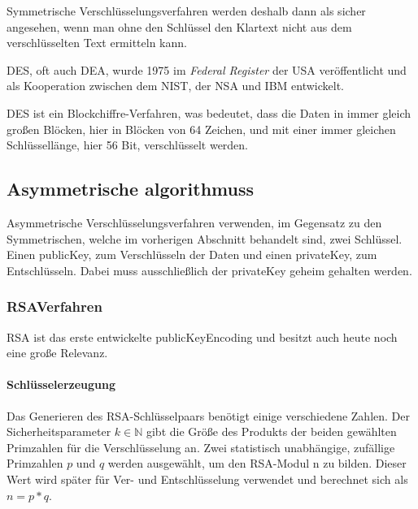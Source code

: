 Symmetrische Verschlüsselungsverfahren werden deshalb dann als sicher angesehen, wenn man ohne den Schlüssel den Klartext nicht aus dem verschlüsselten Text ermitteln kann.\autocite[\pagef~5]{kryptographische-algorithmen}

\ac{DES}, oft auch \ac{DEA}, wurde 1975 im \textit{Federal Register} der USA veröffentlicht und als Kooperation zwischen dem \ac{NIST}, der \ac{NSA} und \ac{IBM} entwickelt.\autocite[\pagef~232]{nsa-meyer}

\ac{DES} ist ein Blockchiffre-Verfahren, was bedeutet, dass die Daten in immer gleich großen Blöcken, hier in Blöcken von 64 Zeichen, und mit einer immer gleichen Schlüssellänge, hier 56 Bit, verschlüsselt werden.\autocite[\pagef~6]{kryptographische-algorithmen}


\subsection[Asymmetrische Algorithmen]{Asymmetrische \glspl{algorithmus}}\label{subsec:asymmetrische-algorithmen}
Asymmetrische Verschlüsselungsverfahren verwenden, im Gegensatz zu den Symmetrischen, welche im vorherigen Abschnitt behandelt sind, zwei Schlüssel.
Einen \gls{publicKey}, zum Verschlüsseln der Daten und einen \gls{privateKey}, zum Entschlüsseln.
Dabei muss ausschließlich der \gls{privateKey} geheim gehalten werden.


\subsubsection[RSA-Verfahren]{\acs{RSA}\nonbreakdash Verfahren}\label{subsubsec:rsa-verfahren}

\ac{RSA} ist das erste entwickelte \gls{publicKeyEncoding} und besitzt auch heute noch eine große Relevanz.\autocite[\pagef~168]{buchmann-einfuhrung-2016}

\paragraph[Schlüsselerzeugung]{Schlüsselerzeugung}\label{par:schluesselerzeugung}
Das Generieren des \ac{RSA}-Schlüsselpaars benötigt einige verschiedene Zahlen.
Der Sicherheitsparameter $k \in \mathbb{N}$ gibt die Größe des Produkts der beiden gewählten Primzahlen für die Verschlüsselung an.
Zwei statistisch unabhängige, zufällige Primzahlen $p$ und $q$ werden ausgewählt, um den \ac{RSA}-Modul n zu bilden.
Dieser Wert wird später für Ver- und Entschlüsselung verwendet und berechnet sich als $n = p*q$.

